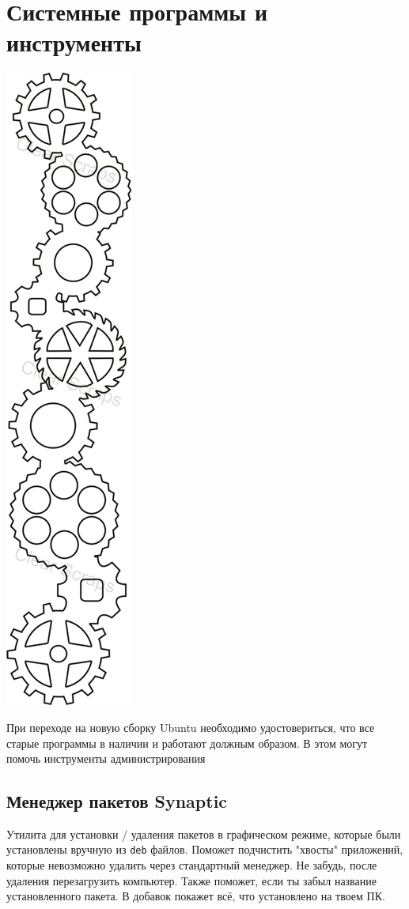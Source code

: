 \documentclass[a4paper, 12pt]{report}
\begin{document}
\section{Системные программы и инструменты} 
\begin{center}
	\includegraphics[scale=0.5,angle=90]{gears}
\end{center} 
При переходе на новую сборку Ubuntu необходимо удостовериться, что все старые программы в наличии и работают должным образом. В этом могут помочь инструменты администрирования
\subsection{Менеджер пакетов Synaptic} Утилита для установки / удаления пакетов в графическом режиме, которые были установлены вручную из \lstinline|deb| файлов. Поможет подчистить "хвосты" приложений, которые невозможно удалить через стандартный менеджер. Не забудь, после удаления перезагрузить компьютер. Также поможет, если ты забыл название установленного пакета. В добавок покажет всё, что установлено на твоем ПК.
\end{document}
